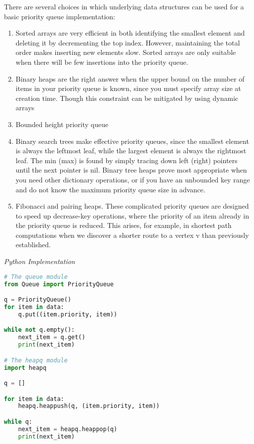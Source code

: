 \documentclass{article}
\begin{document}
    There are several choices in which underlying data structures can be used for a basic priority queue implementation:
    \begin{enumerate}
        \item Sorted arrays are very efficient in both identifying the smallest element and deleting it by decrementing the top index. However, maintaining the total order makes inserting new elements slow. Sorted arrays are only suitable when there will be few insertions into the priority queue.
        
        \item Binary heaps are the right answer when the upper bound on the number of items in your priority queue is known, since you must specify array size at creation time. Though this constraint can be mitigated by using dynamic arrays
        
        \item Bounded height priority queue
        
        \item Binary search trees make effective priority queues, since the smallest element is always the leftmost leaf, while the largest element is always the rightmost leaf. The min (max) is found by simply tracing down left (right) pointers until the next pointer is nil. Binary tree heaps prove most appropriate when you need other dictionary operations, or if you have an unbounded key range and do not know the maximum priority queue size in advance.
        
        \item Fibonacci and pairing heaps. These complicated priority queues are designed to speed up decrease-key operations, where the priority of an item already in the priority queue is reduced. This arises, for example, in shortest path computations when we discover a shorter route to a vertex v than previously established.
    \end{enumerate}
    
\vspace{8pt} \emph{Python Implementation}
\begin{lstlisting}[language=Python]
# The queue module
from Queue import PriorityQueue

q = PriorityQueue()
for item in data:
    q.put((item.priority, item))

while not q.empty():
    next_item = q.get()
    print(next_item)

# The heapq module
import heapq

q = []

for item in data:
    heapq.heappush(q, (item.priority, item))

while q:
    next_item = heapq.heappop(q)
    print(next_item)
\end{lstlisting}
    
\end{document}
